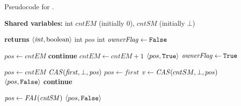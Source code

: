\begin{algorithm}[t]
    \footnotesize
    \caption{Pseudocode for \NextIndex.}
    \label{alg:counter}
    \begin{algorithmic}[1]

        \State \textbf{Shared variables:}
        \State int $\mathit{cntEM}$ (initially $0$), $\mathit{cntSM}$ (initially $\bot$)

        \vspace{2mm}

         \textbf{returns} $\langle \mathit{int, \mbox{boolean}} \rangle$
            \State int $\mathit{pos}$
            \State int $\mathit{ownerFlag} \gets \mbox{\texttt{False}}$
            
            \While{\True}
                 \label{alg:co:em}
                    \State $\mathit{pos} \gets \mathit{cntEM}$ \label{alg:co:em:acquire-pos}
                        \State \textbf{continue} \label{alg:co:em:continue1}
                    \EndIf
                    \State $\mathit{cntEM} \gets \mathit{cntEM}+1$ \label{alg:co:em:inc-elements}
                        \State \Return $\langle pos, \mbox{\texttt{True}} \rangle$ \label{alg:co:em:checkh1}
                    \EndIf
                    \State $\mathit{ownerFlag} \gets \mbox{\texttt{True}}$ \label{alg:co:em:ownerFlag}
                \EndIf

                 \label{alg:co:em:elements-bot}
                     \label{alg:co:em:ifHelper}
                        \State $\mathit{pos} \gets \mathit{cntEM}$ \label{alg:co:em:ownerFlag1}
                        \State $\mathit{\mbox{\textit{CAS}}(first, \bot, pos)}$ \label{alg:co:em:casfirst}
                        \State $\mathit{pos} \gets first$ \label{alg:co:em:pos2}
                    \EndIf
                    \State $\mathit{v} \gets \mbox{\textit{CAS}}(cntSM, \bot, pos)$ \label{alg:co:em:cntSM-init}
                        \State \Return $\langle pos, \mbox{\texttt{False}} \rangle$ \label{alg:co:em:ifOwner}
                        \State \textbf{continue} \label{alg:co:em:continue2}
                    \EndIf
                \EndIf

                \State $\mathit{pos} \gets \mbox{\textit{FAI}}(\mathit{cntSM})$ \label{alg:co:FAI-pos}
                \State \Return $\langle pos, \mbox{\texttt{False}} \rangle$ \label{alg:co:em:return}
            \EndWhile

        \EndFunction

    \end{algorithmic}
\end{algorithm}



